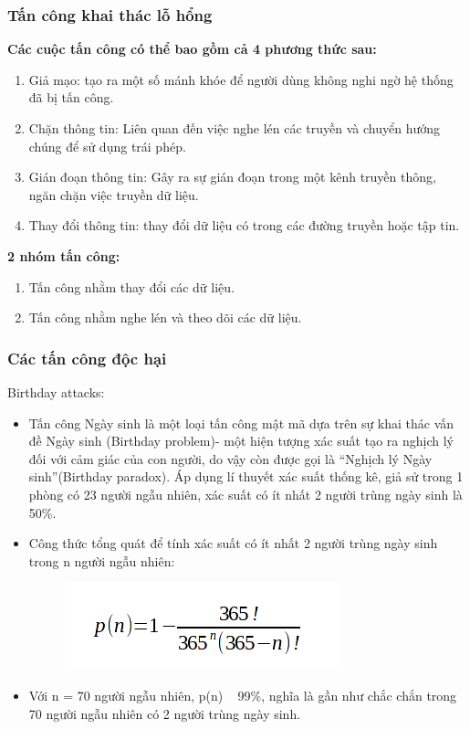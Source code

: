 \documentclass{beamer}
\begin{document}
\begin{frame}
    \frametitle{Tấn công khai thác lỗ hổng}

    \textbf{Các cuộc tấn công có thể bao gồm cả 4 phương thức sau:}
    \begin{enumerate}
        \item Giả mạo: tạo ra một số mánh khóe để người dùng không nghi ngờ hệ thống đã bị tấn công.
        \item Chặn thông tin: Liên quan đến việc nghe lén các truyền và chuyển hướng chúng để sử dụng trái phép.
        \item Gián đoạn thông tin: Gây ra sự gián đoạn trong một kênh truyền thông, ngăn chặn việc truyền dữ liệu.
        \item Thay đổi thông tin: thay đổi dữ liệu có trong các đường truyền hoặc tập tin.
    \end{enumerate}

    \textbf{2 nhóm tấn công:}
    \begin{enumerate}
        \item Tấn công nhằm thay đổi các dữ liệu.
        \item Tấn công nhằm nghe lén và theo dõi các dữ liệu.
    \end{enumerate}
\end{frame}
\begin{frame}
    \frametitle{Các tấn công độc hại}
    \begin{block}{Birthday attacks:}
        \begin{itemize}
            \item Tấn công Ngày sinh là một loại tấn công mật mã dựa trên sự khai thác vấn đề Ngày sinh (Birthday problem)- một hiện tượng xác suất tạo ra nghịch lý đối với cảm giác của con người, do vậy còn được gọi là “Nghịch lý Ngày sinh”(Birthday paradox). Áp dụng lí thuyết xác suất thống kê, giả sử trong 1 phòng có 23 người ngẫu nhiên, xác suất có ít nhất  2 người trùng ngày sinh là 50\%.
            \item Công thức tổng quát để tính xác suất có ít nhất 2 người trùng ngày sinh trong n người ngẫu nhiên:
                  \begin{figure}[h]
                      \centering\includegraphics[width=0.4\linewidth]{images/bday.png}
                  \end{figure}
            \item Với n = 70 người ngẫu nhiên, p(n) ~ 99\%, nghĩa là gần như chắc chắn trong 70 người ngẫu nhiên có 2 người trùng ngày sinh.
        \end{itemize}
    \end{block}
\end{frame}
\end{document}
